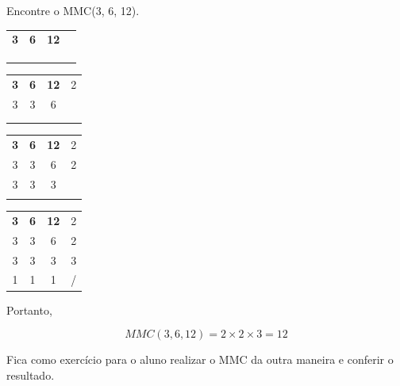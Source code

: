 \begin{exemplo}
    Encontre o MMC(3, 6, 12).

    \begin{table}[H]
    \centering
    \begin{tabular}{ccc|c}
        \textbf{3} & \textbf{6} & \textbf{12} & \\
         &  & \\
         &  & \\
         &  & \\
    \end{tabular}
    \end{table}

    \begin{table}[H]
    \centering
    \begin{tabular}{ccc|c}
        \textbf{3} & \textbf{6} & \textbf{12} & 2\\
        3 & 3 & 6\\
         &  & \\
         &  & \\
    \end{tabular}
    \end{table}

    \begin{table}[H]
    \centering
    \begin{tabular}{ccc|c}
        \textbf{3} & \textbf{6} & \textbf{12} & 2\\
        3 & 3 & 6 & 2\\
        3 & 3 & 3\\
         &  & \\
    \end{tabular}
    \end{table}

    \begin{table}[H]
    \centering
    \begin{tabular}{ccc|c}
        \textbf{3} & \textbf{6} & \textbf{12} & 2\\
        3 & 3 & 6 & 2\\
        3 & 3 & 3 & 3\\
        1 & 1 & 1 & /\\
    \end{tabular}
    \end{table}

    Portanto, 

    \begin{equation}
        MMC(3,6,12)=2\times2\times3=12
    \end{equation}

    Fica como exercício para o aluno realizar o MMC da outra maneira e conferir o resultado.
\end{exemplo}

